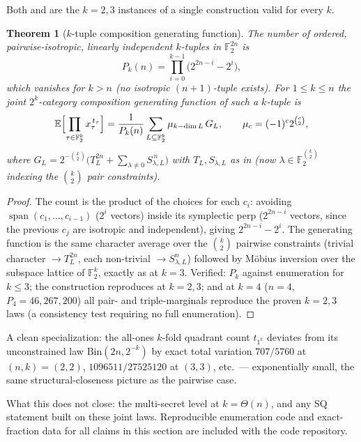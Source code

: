 \documentclass[11pt,a4paper]{article}
\theoremstyle{plain}
\newtheorem{theorem}{Theorem}[section]
\theoremstyle{definition}
\newcommand{\F}{\mathbb{F}}
\newcommand{\E}{\mathbb{E}}
\begin{document}
Both  and  are the $k=2,3$ instances of a single construction valid for every $k$.

\begin{theorem}[$k$-tuple composition generating function]
\label{thm:kfold-gf}
The number of ordered, pairwise-isotropic, linearly independent $k$-tuples in $\F_2^{2n}$ is
\[
P_k(n) = \prod_{i=0}^{k-1}\bigl(2^{2n-i} - 2^i\bigr),
\]
which vanishes for $k > n$ (no isotropic $(n{+}1)$-tuple exists). For $1 \le k \le n$ the joint $2^k$-category composition generating function of such a $k$-tuple is
\[
\E\Bigl[\prod_{\tau \in \F_2^k} x_\tau^{\,t_\tau}\Bigr]
= \frac{1}{P_k(n)} \sum_{L \subseteq \F_2^k} \mu_{k-\dim L}\, G_L,
\qquad
\mu_c = (-1)^c 2^{\binom{c}{2}},
\]
where $G_L = 2^{-\binom{k}{2}}\bigl(T_L^{2n} + \sum_{\lambda \neq 0} S_{\lambda,L}^{\,n}\bigr)$ with $T_L, S_{\lambda,L}$ as in  (now $\lambda \in \F_2^{\binom{k}{2}}$ indexing the $\binom{k}{2}$ pair constraints).
\end{theorem}

\begin{proof}
The count is the product of the choices for each $c_i$: avoiding $\operatorname{span}(c_1,\dots,c_{i-1})$ ($2^i$ vectors) inside its symplectic perp ($2^{2n-i}$ vectors, since the previous $c_j$ are isotropic and independent), giving $2^{2n-i} - 2^i$. The generating function is the same character average over the $\binom{k}{2}$ pairwise constraints (trivial character $\to T_L^{2n}$, each non-trivial $\to S_{\lambda,L}^n$) followed by M\"obius inversion over the subspace lattice of $\F_2^k$, exactly as at $k=3$. Verified: $P_k$ against enumeration for $k \le 3$; the construction reproduces  at $k=2,3$; and at $k=4$ ($n=4$, $P_4 = 46{,}267{,}200$) all pair- and triple-marginals reproduce the proven $k=2,3$ laws (a consistency test requiring no full enumeration).
\end{proof}

A clean specialization: the all-ones $k$-fold quadrant count $t_{1^k}$ deviates from its unconstrained law $\mathrm{Bin}(2n, 2^{-k})$ by exact total variation $707/5760$ at $(n,k)=(2,2)$, $1096511/27525120$ at $(3,3)$, etc.\ --- exponentially small, the same structural-closeness picture as the pairwise case.

What this does not close: the multi-secret level at $k = \Theta(n)$, and any SQ statement built on these joint laws. Reproducible enumeration code and exact-fraction data for all claims in this section are included with the code repository.
\end{document}
